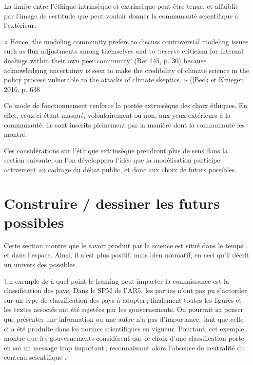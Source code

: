 La limite entre l'éthique intrinsèque et extrinsèque peut être tenue, et affaiblit par l'image de certitude que peut vouloir donner la communauté scientifique à l'extérieur. 
\begin{displayquote}
    « Hence, the modeling community prefers to discuss controversial modeling issues such as flux adjustments among themselves and to ‘reserve criticism for internal dealings within their own peer community’ (Ref 145, p. 30) because acknowledging uncertainty is seen to make the credibility of climate science in the policy process vulnerable to the attacks of climate skeptics. » ([Beck et Krueger, 2016, p. 638
\end{displayquote}
Ce mode de fonctionnement renforce la portée extrinsèque des choix éthiques. En effet, ceux-ci étant masqué, volontairement ou non, aux yeux extérieurs à la communauté, ils sont inscrits pleinement par la manière dont la communauté les montre. 

 Ces considérations sur l'éthique extrinsèque prendront plus de sens dans la section suivante, on l'on développera l'idée que la modélisation participe activement au cadrage du débat public, et donc aux choix de futurs possibles. 

\section{Construire / dessiner les futurs possibles}

Cette section montre que le savoir produit par la science est situé dans le temps et dans l'espace. Ainsi, il n'est plus positif, mais bien normatif, en ceci qu'il décrit un univers des possibles. 

Un exemple de à quel point le framing peut impacter la connaissance est la classification des pays. Dans le SPM de l'AR5, les parties n'ont pas pu s'accorder sur un type de classification des pays à adopter ; finalement toutes les figures et les textes associés ont été rejetées par les gouvernements. On pourrait ici penser que présenter une information ou une autre n'a pas d'importance, tant que celle-ci a été produite dans les normes scientifiques en vigueur. Pourtant, cet exemple montre que les gouvernements considèrent que le choix d'une classification porte en soi un message trop important ; reconnaissant alors l'absence de neutralité du contenu scientifique \cite{edenhofer_mapmakers_2014}. 

